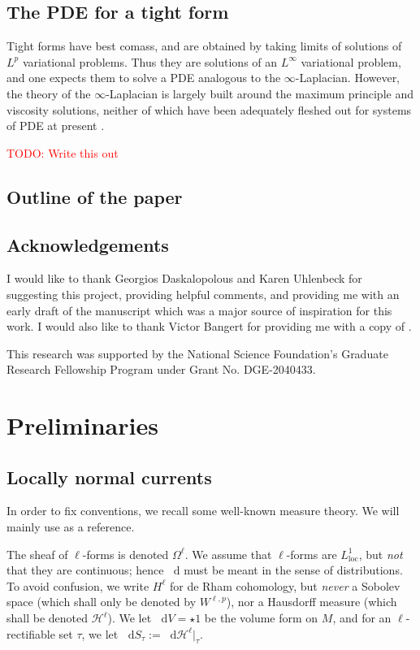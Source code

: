 \documentclass[reqno,11pt]{amsart}
\newcommand*\dif{\mathop{}\!\mathrm{d}}
\newcommand{\loc}{\mathrm{loc}}
\theoremstyle{definition}
\numberwithin{equation}{section}
\newcommand\todo[1]{\textcolor{red}{TODO: #1}}
\begin{document}
\subsection{The PDE for a tight form}
Tight forms have best comass, and are obtained by taking limits of solutions of $L^p$ variational problems.
Thus they are solutions of an $L^\infty$ variational problem, and one expects them to solve a PDE analogous to the $\infty$-Laplacian.
However, the theory of the $\infty$-Laplacian is largely built around the maximum principle and viscosity solutions, neither of which have been adequately fleshed out for systems of PDE at present \cite{Katzourakis2018OnAV,Sheffield12}.

\todo{Write this out}

\subsection{Outline of the paper}

\subsection{Acknowledgements}
I would like to thank Georgios Daskalopolous and Karen Uhlenbeck for suggesting this project, providing helpful comments, and providing me with an early draft of the manuscript \cite{daskalopoulos2023} which was a major source of inspiration for this work.
I would also like to thank Victor Bangert for providing me with a copy of \cite{Auer12}.

This research was supported by the National Science Foundation's Graduate Research Fellowship Program under Grant No. DGE-2040433.


\section{Preliminaries}\label{prevResults}
\subsection{Locally normal currents}
In order to fix conventions, we recall some well-known measure theory.
We will mainly use \cite{simon1983GMT} as a reference.

The sheaf of $\ell$-forms is denoted $\Omega^\ell$.
We assume that $\ell$-forms are $L^1_\loc$, but \emph{not} that they are continuous; hence $\dif$ must be meant in the sense of distributions.
To avoid confusion, we write $H^\ell$ for de Rham cohomology, but \emph{never} a Sobolev space (which shall only be denoted by $W^{\ell, p}$), nor a Hausdorff measure (which shall be denoted $\mathcal H^\ell$).
We let $\dif V = \star 1$ be the volume form on $M$, and for an $\ell$-rectifiable set $\tau$, we let $\dif S_\tau := \dif \mathcal H^\ell|_\tau$.
\end{document}
